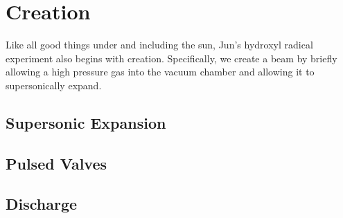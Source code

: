 \chapter{Creation}

Like all good things under and including the sun, Jun's hydroxyl radical experiment also begins with creation. Specifically, we create a beam by briefly allowing a high pressure gas into the vacuum chamber and allowing it to supersonically expand.

\section{Supersonic Expansion}

\section{Pulsed Valves}

\section{Discharge}
